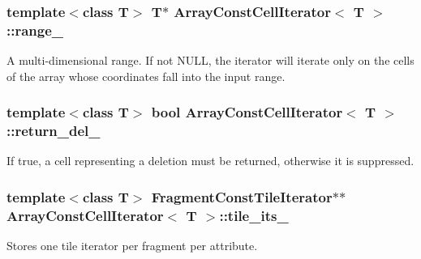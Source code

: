 \subsubsection[{range\+\_\+}]{\setlength{\rightskip}{0pt plus 5cm}template$<$class T$>$ T$\ast$ {\bf Array\+Const\+Cell\+Iterator}$<$ T $>$\+::range\+\_\+\hspace{0.3cm}{\ttfamily [private]}}\label{classArrayConstCellIterator_a56c781c94e0b17ed78d07280e6ea9752}
A multi-\/dimensional range. If not N\+U\+L\+L, the iterator will iterate only on the cells of the array whose coordinates fall into the input range. \hypertarget{classArrayConstCellIterator_ad02a8905ac18e04139f23fec81ef6800}{}
\subsubsection[{return\+\_\+del\+\_\+}]{\setlength{\rightskip}{0pt plus 5cm}template$<$class T$>$ bool {\bf Array\+Const\+Cell\+Iterator}$<$ T $>$\+::return\+\_\+del\+\_\+\hspace{0.3cm}{\ttfamily [private]}}\label{classArrayConstCellIterator_ad02a8905ac18e04139f23fec81ef6800}
If true, a cell representing a deletion must be returned, otherwise it is suppressed. \hypertarget{classArrayConstCellIterator_a08be1edce3014aacd8691eb1e6c75b35}{}
\subsubsection[{tile\+\_\+its\+\_\+}]{\setlength{\rightskip}{0pt plus 5cm}template$<$class T$>$ {\bf Fragment\+Const\+Tile\+Iterator}$\ast$$\ast$ {\bf Array\+Const\+Cell\+Iterator}$<$ T $>$\+::tile\+\_\+its\+\_\+\hspace{0.3cm}{\ttfamily [private]}}\label{classArrayConstCellIterator_a08be1edce3014aacd8691eb1e6c75b35}
Stores one tile iterator per fragment per attribute. \hypertarget{classArrayConstCellIterator_a3c926b368ef8096ebb528b4431b73505}{}
